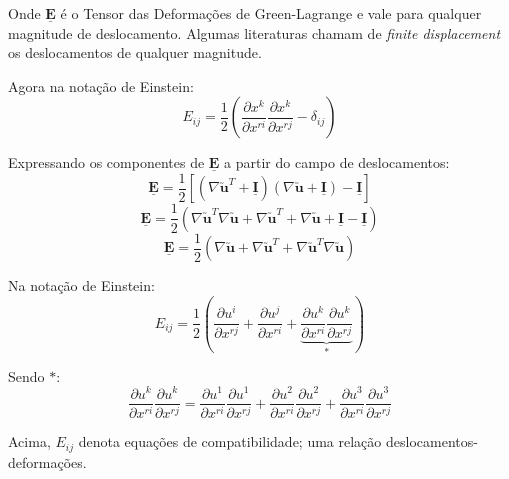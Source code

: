 	Onde $\underline{\mathbf{E}}$ é o Tensor das Deformações de Green-Lagrange e vale para qualquer magnitude de deslocamento. Algumas literaturas chamam de \textit{finite displacement} os deslocamentos de qualquer magnitude.
	
	Agora na notação de Einstein:
	\[E_{ij}=\frac{1}{2}\left(\frac{\partial x^k}{\partial x^{ri}}\frac{\partial x^k}{\partial x^{rj}}-\delta_{ij}\right)\]
	
	Expressando os componentes de $\underline{\mathbf{E}}$ a partir do campo de deslocamentos:
	\[\underline{\mathbf{E}}=\frac{1}{2}[(\nabla\utilde{\mathbf{u}}^T+\underline{\mathbf{I}})(\nabla\utilde{\mathbf{u}}+\underline{\mathbf{I}})-\underline{\mathbf{I}}]\]
	\[\underline{\mathbf{E}}=\frac{1}{2}(\nabla\utilde{\mathbf{u}}^T\nabla\utilde{\mathbf{u}}+\nabla\utilde{\mathbf{u}}^T+\nabla\utilde{\mathbf{u}}+\underline{\mathbf{I}}-\underline{\mathbf{I}})\]
	\[\underline{\mathbf{E}}=\frac{1}{2}(\nabla\utilde{\mathbf{u}}+\nabla\utilde{\mathbf{u}}^T+\nabla\utilde{\mathbf{u}}^T\nabla\utilde{\mathbf{u}})\]
	
	Na notação de Einstein:
	\[E_{ij}=\frac{1}{2}\left(\frac{\partial u^i}{\partial x^{rj}}+\frac{\partial u^j}{\partial x^{ri}}+\underbrace{\frac{\partial u^k}{\partial x^{ri}}\frac{\partial u^k}{\partial x^{rj}}}_{*}\right)\]
	
	Sendo $*$:
	\[\frac{\partial u^k}{\partial x^{ri}}\frac{\partial u^k}{\partial x^{rj}}=\frac{\partial u^1}{\partial x^{ri}}\frac{\partial u^1}{\partial x^{rj}}+\frac{\partial u^2}{\partial x^{ri}}\frac{\partial u^2}{\partial x^{rj}}+\frac{\partial u^3}{\partial x^{ri}}\frac{\partial u^3}{\partial x^{rj}}\]
	
	Acima, $E_{ij}$ denota equações de compatibilidade; uma relação deslocamentos-deformações.